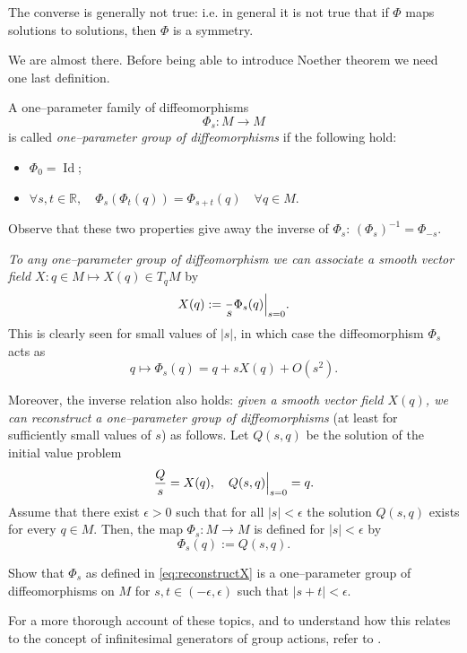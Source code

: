 \documentclass[english,fontsize=11pt,paper=a5,oneside]{scrbook}
\newcommand{\R}{\mathbb{R}}
\let\d\relax
\DeclareMathOperator{\d}{d}
\DeclareMathOperator{\Id}{Id}
\theoremstyle{definition}
\newenvironment{remark}
  {\pushQED{\qed}\renewcommand{\qedsymbol}{$\lozenge$}\remarkx}
  {\popQED\endremarkx}
\newenvironment{exercise}
  {\pushQED{\qed}\renewcommand{\qedsymbol}{$\maltese$}\exercisex}
  {\popQED\endexercisex}
\begin{document}
The converse is generally not true: i.e. in general it is not true that if $\Phi$ maps solutions to solutions, then $\Phi$ is a symmetry.

We are almost there.
Before being able to introduce Noether theorem we need one last definition.

A one--parameter family of diffeomorphisms
\begin{equation}
    \Phi_s : M \to M
\end{equation}
is called \emph{one--parameter group of diffeomorphisms} if the following hold:
\begin{itemize}
    \item $\Phi_0 = \Id$;
    \item $\forall s, t \in \R, \quad \Phi_s(\Phi_t(q)) = \Phi_{s+t}(q)\quad \forall q\in M$.
\end{itemize}
Observe that these two properties give away the inverse of $\Phi_s$: $(\Phi_s)^{-1} = \Phi_{-s}$.

\begin{remark}
\emph{To any one--parameter group of diffeomorphism we can associate a smooth vector field $X : q\in M \mapsto X(q)\in T_qM$} by
\begin{equation}
    X(q) := \frac{\d}{\d s} \Phi_s(q) \Big|_{s=0}.
\end{equation}
This is clearly seen for small values of $|s|$, in which case the diffeomorphism $\Phi_s$ acts as
\begin{equation}\label{eq:infinitesimalSymmetryExp}
    q \mapsto \Phi_s(q) = q + s X(q) + O(s^2).
\end{equation}

Moreover, the inverse relation also holds: \emph{given a smooth vector field $X(q)$, we can reconstruct a one--parameter group of diffeomorphisms} (at least for sufficiently small values of $s$) as follows.
Let $Q(s, q)$ be the solution of the initial value problem
\begin{equation}\label{eq:NoetherCoords}
    \frac{\d Q}{\d s} = X(q), \quad Q(s, q)\Big|_{s=0} = q.
\end{equation}
Assume that there exist $\epsilon >0$ such that for all $|s|<\epsilon$ the solution $Q(s,q)$ exists for every $q\in M$.
Then, the map $\Phi_s:M\to M$ is defined for $|s|<\epsilon$ by 
\begin{equation}\label{eq:reconstructX}
    \Phi_s(q) := Q(s, q).
\end{equation}

\begin{exercise}
    Show that $\Phi_s$ as defined in \eqref{eq:reconstructX} is a one--parameter group of diffeomorphisms on $M$ for $s,t \in(-\epsilon,\epsilon)$ such that $|s + t| < \epsilon$.
\end{exercise}

For a more thorough account of these topics, and to understand how this relates to the concept of infinitesimal generators of group actions, refer to \cite[Chapters 9 and 20]{book:lee}.
\end{remark}
\end{document}
